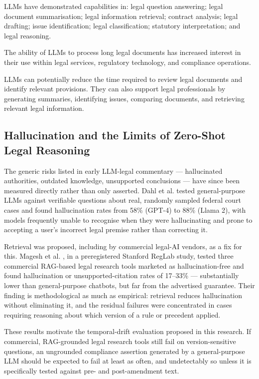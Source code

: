 LLMs have demonstrated capabilities in: legal question answering; legal document summarisation; legal information retrieval; contract analysis; legal drafting; issue identification; legal classification; statutory interpretation; and legal reasoning.

The ability of LLMs to process long legal documents has increased interest in their use within legal services, regulatory technology, and compliance operations.

LLMs can potentially reduce the time required to review legal documents and identify relevant provisions. They can also support legal professionals by generating summaries, identifying issues, comparing documents, and retrieving relevant legal information.

\subsection{Hallucination and the Limits of Zero-Shot Legal Reasoning}

\label{sec:2-5-2}

The generic risks listed in early LLM-legal commentary — hallucinated authorities, outdated knowledge, unsupported conclusions — have since been measured directly rather than only asserted. Dahl et al. \cite{dahl2024legalfictions} tested general-purpose LLMs against verifiable questions about real, randomly sampled federal court cases and found hallucination rates from 58\% (GPT-4) to 88\% (Llama 2), with models frequently unable to recognise when they were hallucinating and prone to accepting a user's incorrect legal premise rather than correcting it.

Retrieval was proposed, including by commercial legal-AI vendors, as a fix for this. Magesh et al. \cite{magesh2025hallucinationfree}, in a preregistered Stanford RegLab study, tested three commercial RAG-based legal research tools marketed as hallucination-free and found hallucination or unsupported-citation rates of 17–33\% — substantially lower than general-purpose chatbots, but far from the advertised guarantee. Their finding is methodological as much as empirical: retrieval reduces hallucination without eliminating it, and the residual failures were concentrated in cases requiring reasoning about which version of a rule or precedent applied.

These results motivate the temporal-drift evaluation proposed in this research. If commercial, RAG-grounded legal research tools still fail on version-sensitive questions, an ungrounded compliance assertion generated by a general-purpose LLM should be expected to fail at least as often, and undetectably so unless it is specifically tested against pre- and post-amendment text.

